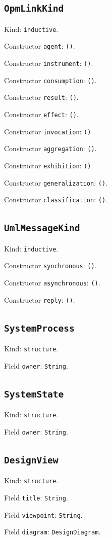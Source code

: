 \documentclass[11pt]{article}
\begin{document}
\subsection*{\texttt{OpmLinkKind}}
\noindent Kind: \texttt{inductive}.\par
\noindent Constructor \texttt{agent}: \texttt{()}.\par
\noindent Constructor \texttt{instrument}: \texttt{()}.\par
\noindent Constructor \texttt{consumption}: \texttt{()}.\par
\noindent Constructor \texttt{result}: \texttt{()}.\par
\noindent Constructor \texttt{effect}: \texttt{()}.\par
\noindent Constructor \texttt{invocation}: \texttt{()}.\par
\noindent Constructor \texttt{aggregation}: \texttt{()}.\par
\noindent Constructor \texttt{exhibition}: \texttt{()}.\par
\noindent Constructor \texttt{generalization}: \texttt{()}.\par
\noindent Constructor \texttt{classification}: \texttt{()}.\par
\subsection*{\texttt{UmlMessageKind}}
\noindent Kind: \texttt{inductive}.\par
\noindent Constructor \texttt{synchronous}: \texttt{()}.\par
\noindent Constructor \texttt{asynchronous}: \texttt{()}.\par
\noindent Constructor \texttt{reply}: \texttt{()}.\par
\subsection*{\texttt{SystemProcess}}
\noindent Kind: \texttt{structure}.\par
\noindent Field \texttt{owner}: \texttt{String}.\par
\subsection*{\texttt{SystemState}}
\noindent Kind: \texttt{structure}.\par
\noindent Field \texttt{owner}: \texttt{String}.\par
\subsection*{\texttt{DesignView}}
\noindent Kind: \texttt{structure}.\par
\noindent Field \texttt{title}: \texttt{String}.\par
\noindent Field \texttt{viewpoint}: \texttt{String}.\par
\noindent Field \texttt{diagram}: \texttt{DesignDiagram}.\par
\end{document}
